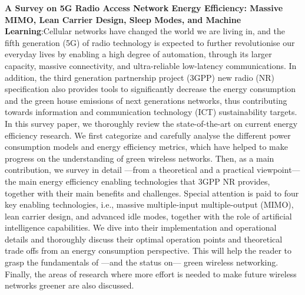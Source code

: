 \textbf{A Survey on 5G Radio Access Network Energy Efficiency: Massive MIMO, Lean Carrier Design, Sleep Modes, and Machine Learning\cite{survey_5g_energy_efficiency}}:Cellular networks have changed the world we are living in, and the fifth generation (5G) of radio technology is expected to further revolutionise our everyday lives by enabling a high degree of automation, through its larger capacity, massive connectivity, and ultra-reliable low-latency communications. In addition, the third generation partnership project (3GPP) new radio (NR) specification also provides tools to significantly decrease the energy consumption and the green house emissions of next generations networks, thus contributing towards information and communication technology (ICT) sustainability targets. In this survey paper, we thoroughly review the state-of-the-art on current energy efficiency research. We first categorize and carefully analyse the different power consumption models and energy efficiency metrics, which have helped to make progress on the understanding of green wireless networks. Then, as a main contribution, we survey in detail —from a theoretical and a practical viewpoint— the main energy efficiency enabling technologies that 3GPP NR provides, together with their main benefits and challenges. Special attention is paid to four key enabling technologies, i.e., massive multiple-input multiple-output (MIMO), lean carrier design, and advanced idle modes, together with the role of artificial intelligence capabilities. We dive into their implementation and operational details and thoroughly discuss their optimal operation points and theoretical trade offs from an energy consumption perspective. This will help the reader to grasp the fundamentals of —and the status on— green wireless networking. Finally, the areas of research where more effort is needed to make future wireless networks greener are also discussed.\\
